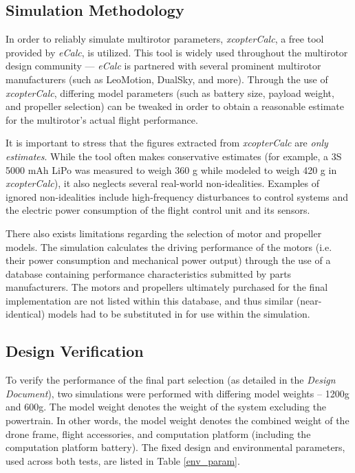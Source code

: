 \subsection{Simulation Methodology}
In order to reliably simulate multirotor parameters, \textit{xcopterCalc}, a free tool provided by \textit{eCalc}, is utilized. This tool is widely used throughout the multirotor design community --- \textit{eCalc} is partnered with several prominent multirotor manufacturers (such as LeoMotion, DualSky, and more). Through the use of \textit{xcopterCalc}, differing model parameters (such as battery size, payload weight, and propeller selection) can be tweaked in order to obtain a reasonable estimate for the multirotor's actual flight performance. 

It is important to stress that the figures extracted from \textit{xcopterCalc} are \textit{only estimates}. While the tool often makes conservative estimates (for example, a 3S 5000 mAh LiPo was measured to weigh 360 g while modeled to weigh 420 g in \textit{xcopterCalc}), it also neglects several real-world non-idealities. Examples of ignored non-idealities include high-frequency disturbances to control systems and the electric power consumption of the flight control unit and its sensors. 

There also exists limitations regarding the selection of motor and propeller models. The simulation calculates the driving performance of the motors (i.e. their power consumption and mechanical power output) through the use of a database containing performance characteristics submitted by parts manufacturers. The motors and propellers ultimately purchased for the final implementation are not listed within this database, and thus similar (near-identical) models had to be substituted in for use within the simulation.

\subsection{Design Verification}
To verify the performance of the final part selection (as detailed in the \textit{Design Document}), two simulations were performed with differing model weights -- 1200g and 600g. The model weight denotes the weight of the system excluding the powertrain. In other words, the model weight denotes the combined weight of the drone frame, flight accessories, and computation platform (including the computation platform battery). The fixed design and environmental parameters, used across both tests, are listed in Table \ref{env_param}.

